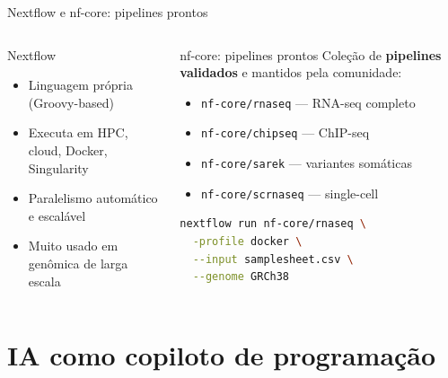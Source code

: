 \begin{frame}[fragile]{Nextflow e nf-core: pipelines prontos}
\begin{columns}
\begin{block}{Nextflow}
\begin{itemize}
    \item Linguagem própria (Groovy-based)
    \item Executa em HPC, cloud, Docker, Singularity
    \item Paralelismo automático e escalável
    \item Muito usado em genômica de larga escala
\end{itemize}
\end{block}

\begin{exampleblock}{nf-core: pipelines prontos}
Coleção de \textbf{pipelines validados} e mantidos pela comunidade:
\begin{itemize}
    \item \texttt{nf-core/rnaseq} — RNA-seq completo
    \item \texttt{nf-core/chipseq} — ChIP-seq
    \item \texttt{nf-core/sarek} — variantes somáticas
    \item \texttt{nf-core/scrnaseq} — single-cell
\end{itemize}
\begin{lstlisting}[language=bash, numbers=none, basicstyle=\ttfamily\tiny]
nextflow run nf-core/rnaseq \
  -profile docker \
  --input samplesheet.csv \
  --genome GRCh38
\end{lstlisting}
\end{exampleblock}
\end{columns}
\end{frame}

\section{IA como copiloto de programação}


